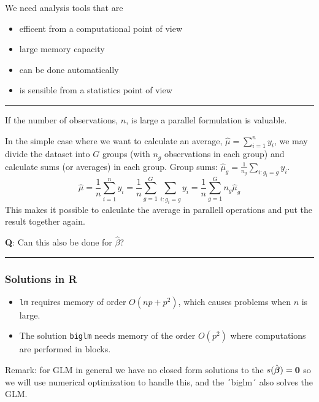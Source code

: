 \documentclass[
]{article}
\providecommand{\tightlist}{%
  \setlength{\itemsep}{0pt}\setlength{\parskip}{0pt}}
\begin{document}
We need analysis tools that are

\begin{itemize}
\tightlist
\item
  efficent from a computational point of view
\item
  large memory capacity
\item
  can be done automatically
\item
  is sensible from a statistics point of view
\end{itemize}

\begin{center}\rule{0.5\linewidth}{0.5pt}\end{center}

If the number of observations, \(n\), is large a parallel formulation is
valuable.

In the simple case where we want to calculate an average,
\(\hat{\mu}=\sum_{i=1}^n y_i\), we may divide the dataset into \(G\)
groups (with \(n_g\) observations in each group) and calculate sums (or
averages) in each group. Group sums:
\(\hat{\mu}_g=\frac{1}{n_g}\sum_{i:g_i=g} y_i\).
\[ \hat{\mu}=\frac{1}{n}\sum_{i=1}^n y_i=\frac{1}{n}\sum_{g=1}^G \sum_{i:g_i=g} y_i=\frac{1}{n}\sum_{g=1}^G n_g \hat{\mu}_g\]
This makes it possible to calculate the average in parallell operations
and put the result together again.

\textbf{Q}: Can this also be done for \(\hat{\beta}\)?

\begin{center}\rule{0.5\linewidth}{0.5pt}\end{center}

\hypertarget{solutions-in-r}{%
\subsubsection{Solutions in R}\label{solutions-in-r}}

\begin{itemize}
\tightlist
\item
  \texttt{lm} requires memory of order \(O(np + p^2)\), which causes
  problems when \(n\) is large.
\item
  The solution \texttt{biglm} needs memory of the order \(O(p^2)\) where
  computations are performed in blocks.
\end{itemize}

Remark: for GLM in general we have no closed form solutions to the
\(s(\hat{\boldsymbol \beta})={\bf 0}\) so we will use numerical
optimization to handle this, and the ´biglm´ also solves the GLM.
\end{document}
